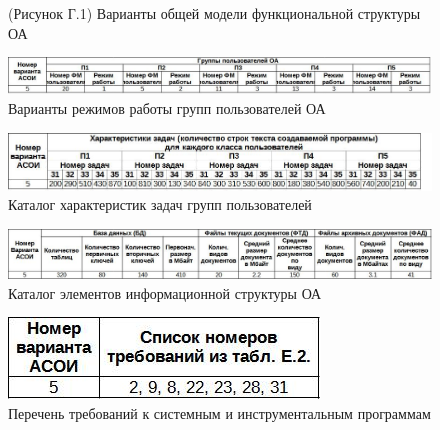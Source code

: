 \documentclass[12pt, a4paper, simple]{eskdtext}
\begin{document}
    \begin{figure}[h!]
        \centering
        \caption{(Рисунок Г.1) Варианты общей модели функциональной структуры ОА}
    \end{figure}

    \begin{figure}[h!]
        \centering
        \includegraphics[width=16cm]
            {_docs/ТаблицаГ1ВариантыРежимовРаботыГруппПользователейОА.jpg}
        \caption{Варианты режимов работы групп пользователей ОА}
    \end{figure}

    \begin{figure}[h!]
        \centering
        \includegraphics[width=16cm]
            {_docs/ТаблицаГ2КаталогХарактеристикЗадачГруппПользователей.jpg}
        \caption{Каталог характеристик задач групп пользователей}
    \end{figure}

    \begin{figure}[ph!]
        \centering
        \includegraphics[width=16cm]
            {_docs/ТаблицаД1КаталогЭлементовИнформационнойСтруктурыОА.jpg}
        \caption{Каталог элементов информационной структуры ОА}
    \end{figure}

    \begin{figure}[ph!]
        \centering
        \includegraphics[]
            {_docs/ТаблицаЕ1ПереченьТребованийКСистемнымИИнструментальнымПрограммам.jpg}
        \caption{Перечень требований к системным и инструментальным программам}
    \end{figure}
\end{document}

